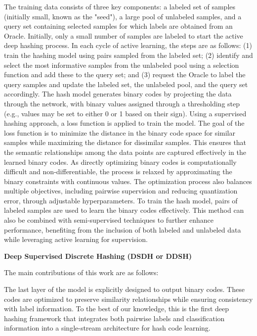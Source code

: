The training data consists of three key components: a labeled set of samples (initially small, known as the "seed"), a large pool of unlabeled samples, and a query set containing selected samples for which labels are obtained from an Oracle. Initially, only a small number of samples are labeled to start the active deep hashing process. In each cycle of active learning, the steps are as follows: (1) train the hashing model using pairs sampled from the labeled set; (2) identify and select the most informative samples from the unlabeled pool using a selection function and add these to the query set; and (3) request the Oracle to label the query samples and update the labeled set, the unlabeled pool, and the query set accordingly.
The hash model generates binary codes by projecting the data through the network, with binary values assigned through a thresholding step (e.g., values may be set to either 0 or 1 based on their sign). Using a supervised hashing approach, a loss function is applied to train the model. The goal of the loss function is to minimize the distance in the binary code space for similar samples while maximizing the distance for dissimilar samples. This ensures that the semantic relationships among the data points are captured effectively in the learned binary codes.
As directly optimizing binary codes is computationally difficult and non-differentiable, the process is relaxed by approximating the binary constraints with continuous values. The optimization process also balances multiple objectives, including pairwise supervision and reducing quantization error, through adjustable hyperparameters.
To train the hash model, pairs of labeled samples are used to learn the binary codes effectively. This method can also be combined with semi-supervised techniques to further enhance performance, benefiting from the inclusion of both labeled and unlabeled data while leveraging active learning for supervision.
\cite{li2016featurelearningbaseddeep}


\textbf{Deep Supervised Discrete Hashing (DSDH or DDSH)}

The main contributions of this work are as follows:

The last layer of the model is explicitly designed to output binary codes. These codes are optimized to preserve similarity relationships while ensuring consistency with label information. To the best of our knowledge, this is the first deep hashing framework that integrates both pairwise labels and classification information into a single-stream architecture for hash code learning.
 
